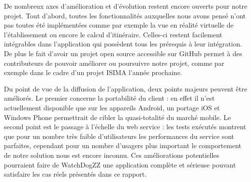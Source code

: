 De nombreux axes d’amélioration et d’évolution restent encore ouverts pour notre projet. Tout d’abord, toutes les fonctionnalités auxquelles nous avons pensé n’ont pas toutes été implémentées comme par exemple la vue en réalité virtuelle de l’établissement ou encore le calcul d’itinéraire. Celles-ci restent facilement intégrables dans l’application qui possèdent tous les prérequis à leur intégration. De plus le fait d'avoir un projet open source accessible sur GitHub permet à des contributeurs de pouvoir améliorer ou poursuivre notre projet, comme par exemple dans le cadre d'un projet ISIMA l'année prochaine.

Du point de vue de la diffusion de l'application, deux points majeurs peuvent être améliorés. Le premier concerne la portabilité du client : en effet il n’est actuellement disponible que sur les appareils Android, un portage iOS et Windows Phone permettrait de cibler la quasi-totalité du marché mobile. Le second point est le passage à l’échelle du web service : les tests exécutés montrent que pour un nombre très faible d’utilisateurs les performances du service sont parfaites, cependant pour un nombre d’usagers plus important le comportement de notre solution nous est encore inconnu. Ces améliorations potentielles pourraient faire de WatchDogZZ une application complète et sérieuse pouvant satisfaire les cas réels présentés dans ce rapport.
